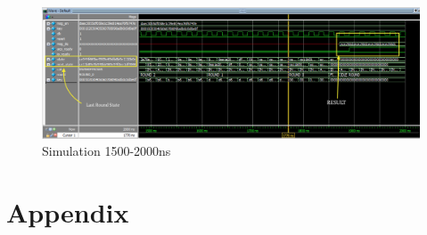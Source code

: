 \documentclass[journal, twocolumn, final,11pt,letterpaper]{IEEEtran}
\begin{document}
\begin{figure} [H]
	\centering
	\includegraphics[scale=.35]{simulate-1500-2000.png}
	\caption{Simulation 1500-2000ns\label{fig:1500-2000}}
\end{figure}          


     

\section*{Appendix}
%
\end{document}
